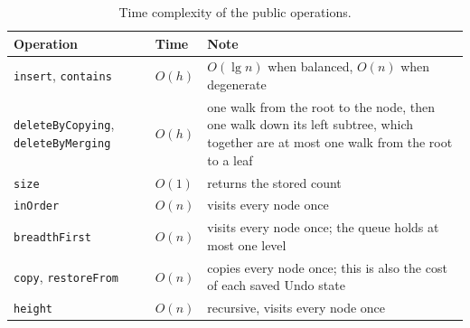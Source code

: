 \begin{table}[H]
\centering
\small
\caption{Time complexity of the public operations.}
\label{tab:complexity}
\begin{tabularx}{\textwidth}{p{4cm} p{3.2cm} X}
\toprule
Operation & Time & Note \\
\midrule
\texttt{insert}, \texttt{contains} & $O(h)$ & $O(\lg n)$ when balanced, $O(n)$ when degenerate \\
\texttt{deleteByCopying}, \texttt{deleteByMerging} & $O(h)$ & one walk from the root to the node, then one walk down its left subtree, which together are at most one walk from the root to a leaf \\
\texttt{size} & $O(1)$ & returns the stored count \\
\texttt{inOrder} & $O(n)$ & visits every node once \\
\texttt{breadthFirst} & $O(n)$ & visits every node once; the queue holds at most one level \\
\texttt{copy}, \texttt{restoreFrom} & $O(n)$ & copies every node once; this is also the cost of each saved Undo state \\
\texttt{height} & $O(n)$ & recursive, visits every node once \\
\bottomrule
\end{tabularx}
\end{table}